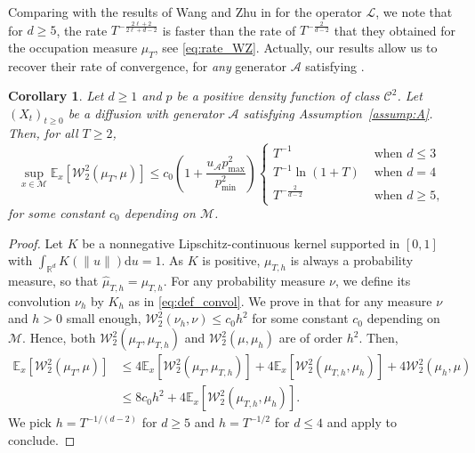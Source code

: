 \documentclass[10pt,a4paper]{article}
\newcommand{\R}{{\mathbb R}}
\newcommand{\cL}{\mathcal{L}}
\newcommand\cA{\mathcal{A}}
\newcommand\cC{\mathcal{C}}
\newcommand\cM{\mathcal{M}}
\newcommand\W{\mathcal{W}}
\newcommand\dd{\mathrm{d}}
\newcommand{\SBRA}[1]{{{\left[#1\right]}}} %
\newtheorem{corollary}[theorem]{Corollary}
\begin{document}
Comparing with the results of Wang and Zhu in \cite{Wang2023} for the operator $\cL$, we note that for $d\ge 5$, the rate $T^{-\frac{2\ell+2}{2\ell+d-2}}$ is faster than the rate of $T^{-\frac{2}{d-2}}$ that they obtained for the occupation measure $\mu_T$, see \eqref{eq:rate_WZ}. Actually, our results allow us to recover their rate of convergence, for \textit{any} generator $\cA$ satisfying .

\begin{corollary}\label{cor:empirical_measure}
    Let $d\ge 1$ and $p$ be a positive density function of class $\cC^2$. 
Let $(X_t)_{t\ge 0}$ be a diffusion with generator $\cA$ satisfying Assumption~\ref{assump:A}. Then, for all $T\ge 2$,
\begin{equation}
   \sup_{x\in \cM} \mathbb{E}_x\SBRA{\W_2^2(\mu_T,\mu)} \le  c_0\left(1+\frac{u_{\cA}p^2_{\max}}{p^2_{\min}}\right)\begin{cases}
 T^{-1} & \mbox{ when }d\le 3 \\
 T^{-1} \ln(1+T) & \mbox{ when }d=4\\
 T^{-\frac{2}{d-2}} & \mbox{ when }d\ge 5,
\end{cases}  
\end{equation}
for some constant $c_0$ depending on $\cM$.
\end{corollary}
\begin{proof}
    Let $K$ be a nonnegative Lipschitz-continuous kernel supported in $[0,1]$ with $\int_{\R^d}K(\|u\|)\dd u=1$. As $K$ is positive, $\mu_{T,h}$ is always a probability measure, so that $\widehat{\mu}_{T,h}=\mu_{T,h}$. For any probability measure $\nu$, we define its convolution $\nu_h$ by $K_h$ as in \eqref{eq:def_convol}. We prove in  that for any measure $\nu$ and $h>0$ small enough,  {$\W_2^2(\nu_h,\nu)\le  c_0 h^2$ for some constant $c_0$ depending on $\cM$}. Hence, both $\W_2^2(\mu_T,\mu_{T,h})$ and $\W_2^2(\mu,\mu_{h})$ are of order $h^2$.  Then, 
    \begin{align*}
        \mathbb{E}_x\SBRA{\W_2^2(\mu_T,\mu)} &\le 4\mathbb{E}_x\SBRA{\W_2^2(\mu_T,\mu_{T,h})} +4\mathbb{E}_x\SBRA{\W_2^2(\mu_{T,h},\mu_h)}+ 4\W_2^2(\mu_h,\mu) \\
        &\le 8 c_0h^2  +4\mathbb{E}_x\SBRA{\W_2^2(\mu_{T,h},\mu_h)}.
    \end{align*} 
    We pick $h=T^{-1/(d-2)}$ for $d\ge 5$ and $h=T^{-1/2}$ for $d\le 4$ and apply  to conclude.
\end{proof}
\end{document}
